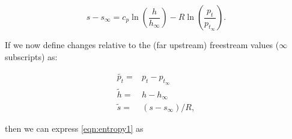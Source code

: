 \begin{equation}
    \label{eqn:entropy1}
        s-s_\infty = c_p \ln\left(\frac{h}{h_\infty}\right) - R \ln\left(\frac{p_t}{p_{t_\infty}}\right).
\end{equation}






If we now define changes relative to the (far upstream) freestream values (\(\infty\) subscripts) as:

\begin{align}
    \widetilde{p_t} =& p_t - p_{t_\infty} \\
    \widetilde{h} =& h - h_\infty \\
    \widetilde{s} =& (s - s_\infty)/R,
\end{align}

\noindent then we can express \cref{eqn:entropy1} as



